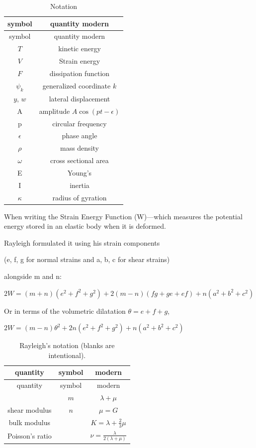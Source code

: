 \begin{longtable}[]{@{}cc@{}}
\caption{Notation}\label{tbl:notation}\tabularnewline%
symbol & quantity modern \\
\midrule\noalign{}
\endfirsthead%
\toprule\noalign{}
symbol & quantity modern \\
\midrule\noalign{}
\endhead%
\endlastfoot%
\(T\) & kinetic energy \\
\(V\) & Strain energy \\
\(F\) & dissipation function \\
\(\psi_k\) & generalized coordinate \(k\) \\
\(y\), \(w\) & lateral displacement \\
A & amplitude \(A \cos( p t - \epsilon)\) \\
p & circular frequency \\
\(\epsilon \) & phase angle \\
\(\rho \) & mass density \\
\(\omega \) & cross sectional area \\
E & Young's \\
I & inertia \\
\(\kappa \) & radius of gyration \\
\end{longtable}


When writing the Strain Energy Function (W)---which measures the
potential energy stored in an elastic body when it is deformed.

Rayleigh formulated it using his strain components

(e, f, g for normal strains and a, b, c for shear strains)

alongside m and n:

\(2W=(m+n)(e^{2}+f^{2}+g^{2})+2(m-n)(f g+g e+ef)+n(a^{2}+b^{2}+c^{2})\)

Or in terms of the volumetric dilatation \(\theta = e + f + g\),

\(2W=(m-n)\theta^{2}+2n(e^{2}+f^{2}+g^{2})+n(a^{2}+b^{2}+c^{2})\)

\begin{longtable}[]{@{}ccc@{}}
\caption{Rayleigh's notation (blanks are intentional).}\label{tbl:archaic}
\tabularnewline%
quantity & symbol & modern \\
\midrule\noalign{}
\endfirsthead%
\toprule\noalign{}
quantity & symbol & modern \\
\midrule\noalign{}
\endhead%
\endlastfoot{}%
                 &\(m\)& \(\lambda + \mu \)  \\
shear modulus    &\(n\)& \(\mu = G\) \\
bulk modulus     &     & \(K = \lambda + \frac{2}{3} \mu \) \\
Poisson's ratio  &     & \(\nu = \frac{\lambda }{2 (\lambda + \mu )} \) \\
\end{longtable}

